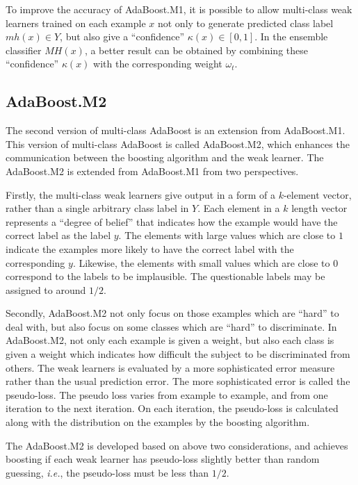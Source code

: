 To improve the accuracy of AdaBoost.M1, it is possible to allow multi-class weak learners trained on each example $x$ not only to generate predicted class label $mh(x)\in Y$, but also give a ``confidence'' $\kappa(x) \in [0,1]$. In the ensemble classifier $MH(x)$, a better result can be obtained by combining these ``confidence'' $\kappa(x)$ with the corresponding weight $\omega_{t}$.

\subsection{AdaBoost.M2}
The second version of multi-class AdaBoost is an extension from AdaBoost.M1. This version of multi-class AdaBoost is called \mbox{AdaBoost.M2}, which enhances the communication between the boosting algorithm and the weak learner. The \mbox{AdaBoost.M2} is extended from \mbox{AdaBoost.M1} from two perspectives.

Firstly, the multi-class weak learners give output in a form of a $k$-element vector, rather than a single arbitrary class label in $Y$. Each element in a $k$ length vector represents a ``degree of belief'' that indicates how the example would have the correct label as the label $y$. The elements with large values which are close to $1$ indicate the examples more likely to have the correct label with the corresponding $y$. Likewise, the elements with small values which are close to $0$ correspond to the labels to be implausible. The questionable labels may be assigned to around $1/2$.

Secondly, AdaBoost.M2 not only focus on those examples which are ``hard'' to deal with, but also focus on some classes which are ``hard'' to discriminate. In AdaBoost.M2, not only each example is given a weight, but also each class is given a weight which indicates how difficult the subject to be discriminated from others. The weak learners is evaluated by a more sophisticated error measure rather than the usual prediction error. The more sophisticated error is called the pseudo-loss. The pseudo loss varies from example to example, and from one iteration to the next iteration. On each iteration, the pseudo-loss is calculated along with the distribution on the examples by the boosting algorithm. 

The AdaBoost.M2 is developed based on above two considerations, and achieves boosting if each weak learner has pseudo-loss slightly better than random guessing, \textit{i.e.}, the pseudo-loss must be less than $1/2$.

